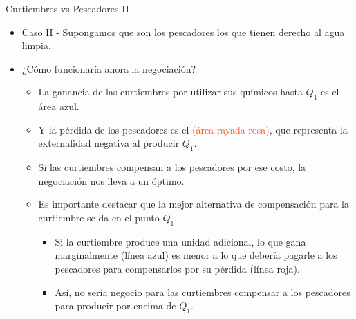 \documentclass{beamer}
\begin{document}
\begin{frame}{Curtiembres vs Pescadores II}
\begin{itemize}
    \item Caso II - Supongamos que son los pescadores los que tienen derecho al agua limpia. \vspace{1mm}
    \item ¿Cómo funcionaría ahora la negociación? 
    \begin{itemize}
        \item  La ganancia de las curtiembres por utilizar sus químicos hasta $Q_1$ es el \textcolor{blue!50}{área azul}.  
        \item Y la pérdida de los pescadores es el \textcolor{OrangeRed}{(área rayada rosa)}, que representa la externalidad negativa al producir $Q_1$.
        \item Si las curtiembres compensan a los pescadores por ese costo, la negociación nos lleva a un óptimo.
        \vspace{0.5mm}
        \item Es importante destacar que la mejor alternativa de compensación para la curtiembre se da en el punto $Q_1$.
        \begin{itemize}
        \item Si la curtiembre produce una unidad adicional, lo que gana marginalmente (línea azul) es menor a lo que debería pagarle a los pescadores para compensarlos por su pérdida (línea roja).
        \item Así, no sería negocio para las curtiembres compensar a los pescadores para producir por encima de $Q_1$.
        \end{itemize}
    \end{itemize}
\end{itemize}
\end{frame}
\end{document}
